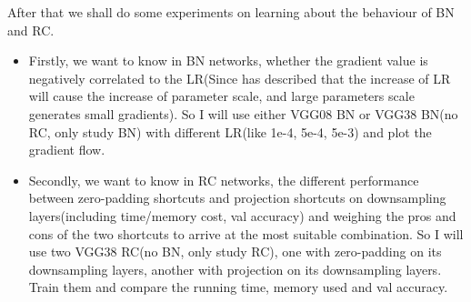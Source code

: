 {{        After that we shall do some experiments on learning about the behaviour of BN and RC.
    \begin{itemize}
        \item Firstly, we want to know in BN networks, whether 
        the gradient value is negatively correlated to 
        the LR(Since \cite{ioffe2015batch} has described that the increase of LR will cause 
        the increase of parameter scale, and large parameters scale generates small gradients).
        So I will use either VGG08 BN or VGG38 BN(no RC, only study BN) with different 
        LR(like 1e-4, 5e-4, 5e-3) and plot the gradient flow.
        \item Secondly, we want to know in RC networks, the different performance between 
        zero-padding shortcuts and projection shortcuts on downsampling 
        layers(including time/memory cost, val accuracy) and weighing the pros and cons of 
        the two shortcuts to arrive at the most suitable combination. 
        So I will use two VGG38 RC(no BN, only study RC), one with zero-padding on its downsampling 
        layers, another with projection on its downsampling layers. Train them and compare the 
        running time, memory used and val accuracy. 
    \end{itemize}

}
}

